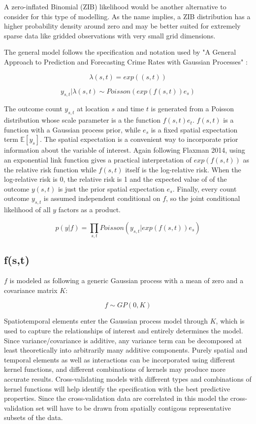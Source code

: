 A zero-inflated Binomial (ZIB) likelihood would be another alternative to consider for this type of modelling. As the name implies, a ZIB distribution has a higher probability density around zero and may be better suited for extremely sparse data like gridded observations with very small grid dimensions.

 The general model follows the specification and notation used by "A General Approach to Prediction and Forecasting Crime Rates with Gaussian Processes" \cite{flaxman_2014}: \par


$$\lambda(s,t) = exp((s,t))$$

$$ y_{s,t} | \lambda(s,t) \sim Poisson(exp(f(s,t))e_s) $$

The outcome count $y_{s,t}$ at location $s$ and time $t$ is generated from a Poisson distribution whose scale parameter is a the function $f(s,t)e_t$. $f(s,t)$ is a function with a Gaussian process prior, while $e_s$ is a fixed spatial expectation term $\mathbb{E}[y_s]$. The spatial expectation is a convenient way to incorporate prior information about the variable of interest. Again following Flaxman 2014, using an exponential link function gives a practical interpretation of $exp(f(s,t))$ as the relative risk function while $f(s,t)$ itself is the log-relative risk. When the log-relative risk is 0, the relative risk is 1 and the expected value of of the outcome $y(s,t)$ is just the prior spatial expectation $e_s$. Finally, every count outcome $y_{s,t}$ is assumed independent conditional on $f$, so the joint conditional likelihood of all $y$ factors as a product.

$$p(y|f) = \prod_{s,t}{ Poisson( y_{s,t}| exp(f(s,t))e_s)}$$

\subsection{f(s,t)}

$f$ is modeled as following a generic Gaussian process with a mean of zero and a covariance matrix $K$:

$$ f \sim GP(0,K) $$

Spatiotemporal elements enter the Gaussian process model through $K$, which is used to capture the relationships of interest and entirely determines the model. Since variance/covariance is additive, any variance term can be decomposed at least theoretically into arbitrarily many additive components. Purely spatial and temporal elements as well as interactions can be incorporated using different kernel functions, and different combinations of kernels may produce more accurate results. Cross-validating models with different types and combinations of kernel functions will help identify the specification with the best predictive properties. Since the cross-validation data are correlated in this model the cross-validation set will have to be drawn from spatially contigous representative subsets of the data.

